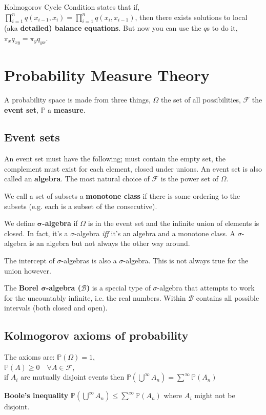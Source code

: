 \documentclass[10pt,landscape,a4paper]{article}
\begin{document}
\begin{multicols*}{4}
Kolmogorov Cycle Condition states that if, 
$\prod_{i=1}^n q(x_{i-1}, x_i) = \prod_{i=1}^n q(x_{i}, x_{i-1})$, then there
exists solutions to local (aka \textbf{detailed) balance equations}. But now you
can use the $q$s to do it, $\pi_x q_{xy} = \pi_y q_{yx}$.
\section{Probability Measure Theory}
A probability space is made from three things,
$\Omega$ the set of all possibilities,
$\mathcal{F}$ the \textbf{event set},
$\mathbb{P}$ a \textbf{measure}.
\subsection{Event sets}
An event set must have the following;
must contain the empty set, the complement must exist for each element,
closed under unions. An event set is also called an \textbf{algebra}.
The most natural choice of $\mathcal{F}$ is the power set of $\Omega$.

We call a set of subsets a \textbf{monotone class} if there is some ordering
to the subsets (e.g. each is a subset of the consecutive).

We define \textbf{$\bm{\sigma}$-algebra} if $\Omega$ is in the event set and
the infinite union of elements is closed. In fact, it's a $\sigma$-algebra
\emph{iff} it's an algebra and a monotone class.
A $\sigma$-algebra is an algebra but not always the other way around.

The intercept of $\sigma$-algebras is also a $\sigma$-algebra. This is not
always true for the union however.

The \textbf{Borel $\bm{\sigma}$-algebra ($\bm{\mathscr{B}}$)} 
is a special type of $\sigma$-algebra
that attempts to work for the uncountably infinite, i.e. the real numbers. Within
$\mathscr{B}$ contains all possible intervals (both closed and open).
\subsection{Kolmogorov axioms of probability}
The axioms are:
$\mathbb{P}(\Omega) = 1$, \\
$\mathbb{P}(A) \geq 0 \quad \forall A \in \mathscr{F}$, \\
if $A_i$ are mutually disjoint events then
$\mathbb{P}(\bigcup^\infty A_n) = \sum^\infty \mathbb{P}(A_n)$

\textbf{Boole's inequality}
$\mathbb{P}(\bigcup^\infty A_n) \leq \sum^\infty \mathbb{P}(A_n)$ where $A_i$ might
not be disjoint.


\end{multicols*}
\end{document}
